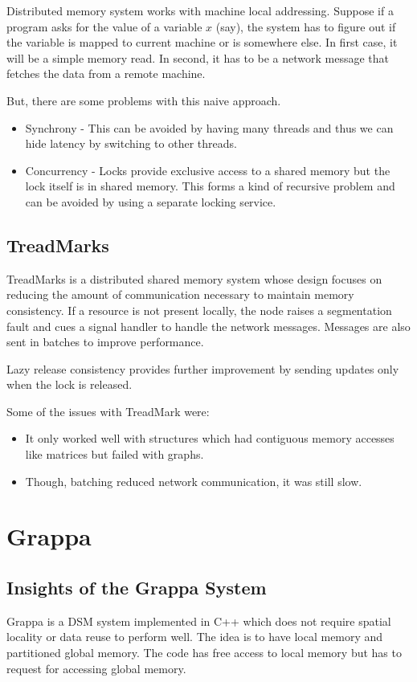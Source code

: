\documentclass[twoside]{article}
\begin{document}
Distributed memory system works with machine local addressing.
Suppose if a program asks for the value of
a variable $x$ (say), the system has to figure out if the variable is mapped to
current machine or is somewhere else. In first case, it will be a simple memory
read. In second, it has to be a network message that fetches the data from a
remote machine. \newline

But, there are some problems with this naive approach.
\begin{itemize}
    \item Synchrony - This can be avoided by having many threads and thus we can hide latency by switching to other threads.
    \item Concurrency - Locks provide exclusive access to a shared memory but the lock itself is in shared memory. This forms a kind of recursive problem and can be avoided by using a separate locking service.
\end{itemize}

\subsection{TreadMarks}

TreadMarks is a distributed shared memory system whose design focuses on reducing the amount of communication necessary to maintain memory consistency. If a resource is not present locally, the node raises a segmentation fault and cues a signal handler to handle the network messages. Messages are also sent in batches to improve performance.\newline

Lazy release consistency provides further improvement by sending updates only when the lock is released.\newline

Some of the issues with TreadMark were: 
\begin{itemize}
    \item It only worked well with structures which had contiguous memory accesses like matrices but failed with graphs.
    \item Though, batching reduced network communication, it was still slow.
\end{itemize}

\section{Grappa}
\subsection{Insights of the Grappa System}
Grappa is a DSM system implemented in C++ which does not require spatial locality or data reuse to perform well. The idea is to have local memory and partitioned global memory. The code has free access to local memory but has to request for accessing global memory.\newline
\end{document}
